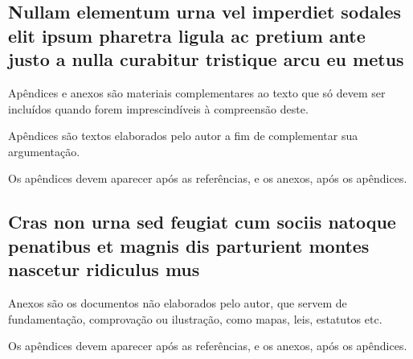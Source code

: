 \documentclass[
	article,			%
	12pt,				%
	oneside,			%
	a4paper,			%
    BIBLATEX,           %
	english,			%
	brazil,				%
	sumario=tradicional
	]{abntex2}
\begin{document}
\newpage
\begin{apendicesenv}

\chapter{Nullam elementum urna vel imperdiet sodales elit ipsum pharetra ligula
ac pretium ante justo a nulla curabitur tristique arcu eu metus}
Apêndices e anexos são materiais complementares ao texto que só devem ser incluídos quando forem imprescindíveis à compreensão deste.

Apêndices são textos elaborados pelo autor a fim de complementar sua argumentação.

Os apêndices devem aparecer após as referências, e os anexos, após os apêndices.

\end{apendicesenv}

\newpage
\begin{anexosenv}

\chapter{Cras non urna sed feugiat cum sociis natoque penatibus et magnis dis
parturient montes nascetur ridiculus mus}

Anexos são os documentos não elaborados pelo autor, que servem de fundamentação, comprovação ou ilustração, como mapas, leis, estatutos etc.

Os apêndices devem aparecer após as referências, e os anexos, após os apêndices.

\end{anexosenv}
\end{document}
